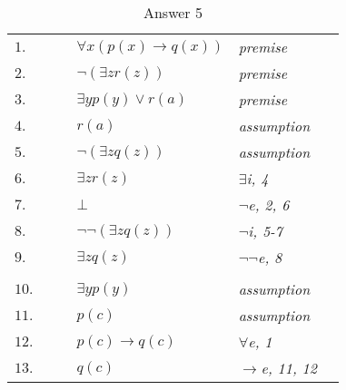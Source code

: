 \documentclass[12pt]{article}
\begin{document}
\begin{table}[H]
	\centering
	\caption{Answer 5}
	\vspace{5px}
	\begin{tabular}{*6{l}}
		$1.$ & & & $\forall x(p(x) \rightarrow q(x))$ & \textit{premise} & \\
		
		$2.$ & & & $\neg(\exists zr(z))$ & \textit{premise} & \\
		
		$3.$ & & & $\exists y p(y) \lor r(a)$ & \textit{premise} & \\
		\cline{2-6}
		
	
		$4.$ &\multicolumn{1}{|c}{} & & $r(a)$ &\textit{assumption} &\multicolumn{1}{c|}{}\\
		\cline{3-5}
		
		$5.$ &\multicolumn{1}{|c|}{} & & $\neg (\exists z q(z))$ &\textit{assumption} &\multicolumn{1}{|c|}{}\\ 
		
		$6.$ &\multicolumn{1}{|c|}{} & & $\exists z r(z)$ &\textit{$\exists$i, 4} &\multicolumn{1}{|c|}{}\\
		
		$7.$ &\multicolumn{1}{|c|}{} & & $\bot$
		&\textit{$\neg$e, 2, 6} &\multicolumn{1}{|c|}{}\\
		\cline{3-5}
		
		$8.$ &\multicolumn{1}{|c}{} & & $\neg\neg (\exists z q(z))$ &\textit{$\neg$i, 5-7} &\multicolumn{1}{c|}{}\\
		
		$9.$ &\multicolumn{1}{|c}{} & & $\exists z q(z)$ &\textit{$\neg\neg$e,  8} &\multicolumn{1}{c|}{}\\ 
		\cline{2-6}
		
        &\multicolumn{1}{c}{} & &  & &\multicolumn{1}{c}{}\\
        \cline{2-6}

		
		$10.$ &\multicolumn{1}{|c}{} & & $\exists y p(y)$ &\textit{assumption} &\multicolumn{1}{c|}{}\\
		\cline{3-5}
		
		$11.$ &\multicolumn{1}{|c|}{} & & $p(c)$ &\textit{assumption} &\multicolumn{1}{|c|}{}\\ 
		
		$12.$ &\multicolumn{1}{|c|}{} & & $p(c) \rightarrow q(c)$ &\textit{$\forall$e, 1} &\multicolumn{1}{|c|}{}\\
		
		$13.$ &\multicolumn{1}{|c|}{} & & $q(c)$
		&\textit{$\rightarrow$e, 11, 12} &\multicolumn{1}{|c|}{}\\


\end{tabular}
\end{table}
\end{document}

